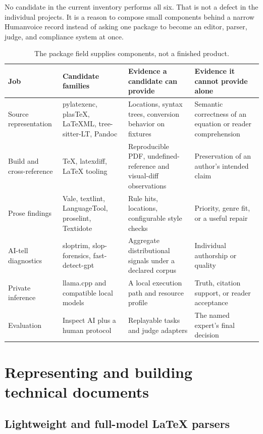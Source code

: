 No candidate in the current inventory performs all six. That is not a defect in
the individual projects. It is a reason to compose small components behind a
narrow Humanvoice record instead of asking one package to become an editor,
parser, judge, and compliance system at once.

\begin{table}[H]
\centering
\small
\begin{tabularx}{\textwidth}{@{}p{}p{}L p{0.21\textwidth}@{}}
\toprule
Job & Candidate families & Evidence a candidate can provide & Evidence it
cannot provide alone \\
\midrule
Source representation & pylatexenc, plasTeX, LaTeXML, tree-sitter-LT, Pandoc &
Locations, syntax trees, conversion behavior on fixtures & Semantic correctness
of an equation or reader comprehension \\
Build and cross-reference & TeX, latexdiff, LaTeX tooling & Reproducible PDF,
undefined-reference and visual-diff observations & Preservation of an author's
intended claim \\
Prose findings & Vale, textlint, LanguageTool, proselint, Textidote & Rule hits,
locations, configurable style checks & Priority, genre fit, or a useful repair \\
AI-tell diagnostics & sloptrim, slop-forensics, fast-detect-gpt & Aggregate
distributional signals under a declared corpus & Individual authorship or
quality \\
Private inference & llama.cpp and compatible local models & A local execution
path and resource profile & Truth, citation support, or reader acceptance \\
Evaluation & Inspect AI plus a human protocol & Replayable tasks and judge
adapters & The named expert's final decision \\
\bottomrule
\end{tabularx}
\caption{The package field supplies components, not a finished product.}
\label{tab:software-capability-map}
\end{table}

\section{Representing and building technical documents}
\label{sec:software-parsers}

\subsection{Lightweight and full-model LaTeX parsers}

